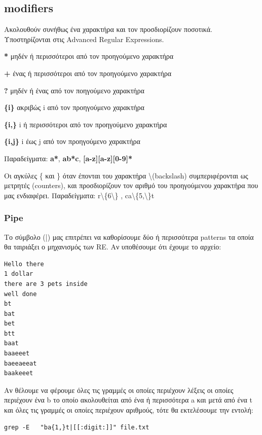 \subsection{modifiers} 
Ακολουθούν συνήθως ένα χαρακτήρα και τον προσδιορίζουν ποσοτικά. Υποστηρίζονται στις Advanced Regular Expressions.

\begin{packed_item}
	\item \textbf{*} μηδέν ή περισσότεροι από τον προηγούμενο χαρακτήρα
	\item  \textbf{+} ένας ή περισσότεροι από τον προηγούμενο χαρακτήρα
	\item \textbf{?} μηδέν ή ένας από τον ποηγούμενο χαρακτήρα
	\item \textbf{\{i\}} ακριβώς i από τον προηγούμενο χαρακτήρα
	\item \textbf{\{i,\}} i ή περισσότεροι από τον προηγούμενο χαρακτήρα
	\item \textbf{\{i,j\}} i έως j από τον προηγούμενο χαρακτήρα 
\end{packed_item}

Παραδείγματα: \textbf{a*}, \textbf{ab*c}, \textbf{[a-z][a-z][0-9]*}

Οι αγκύλες \{ και \} όταν έπονται του χαρακτήρα \textbackslash (backslash)  συμπεριφέρονται ως μετρητές (counters), και προσδιορίζουν τον
αριθμό του προηγούμενου χαρακτήρα που μας ενδιαφέρει. Παραδείγματα: r\textbackslash\{6\textbackslash\} ,
ca\textbackslash\{5,\textbackslash\}t

\subsubsection{Pipe}

Το σύμβολο (|) μας επιτρέπει να καθορίσουμε δύο ή περισσότερα patterns τα οποία θα ταιριάξει ο μηχανισμός των RE. 
Αν υποθέσουμε ότι έχουμε το αρχείο:
\begin{lstlisting}
Hello there
1 dollar 
there are 3 pets inside
well done
bt
bat
bet
btt
baat
baaeeet
baeeaeeat
baakeeet
\end{lstlisting}

Αν θέλουμε να φέρουμε όλες τις γραμμές οι οποίες περιέχουν λέξεις οι οποίες περιέχουν ένα b το οποίο ακολουθείται από ένα ή περισσότερα a και μετά από ένα t και όλες τις γραμμές οι οποίες περιέχουν αριθμούς, τότε θα εκτελέσουμε την εντολή:



\begin{lstlisting}[upquote=true]
grep -E   "ba{1,}t|[[:digit:]]" file.txt
\end{lstlisting}

